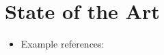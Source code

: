 \section{State of the Art}
\label{sec:State of the Art}

\begin{itemize}
	\item Example references: \citep{Raibert1986LeggedRobotsThatBalance, Vukobratovic2004ZeroMomentPoint, Pratt1995SEA}
\end{itemize}